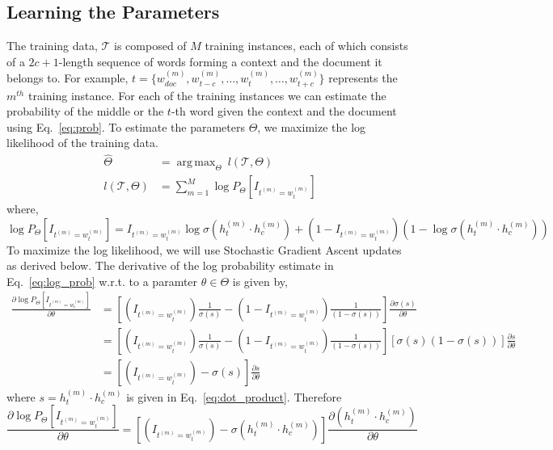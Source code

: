 \documentclass{article}
\DeclareMathOperator*{\argmax}{arg\,max}
\begin{document}
\subsection{Learning the Parameters}
The training data, $\mathcal{T}$ is composed of $M$ training instances, each of which consists of a $2c+1$-length sequence of words forming a context and the document it belongs to. For example, $t = \{w^{(m)}_{doc}, w^{(m)}_{t-c}, \ldots, w^{(m)}_{t}, \ldots, w^{(m)}_{t+c}\}$ represents the $m^{th}$ training instance. 
For each of the training instances we can estimate the probability of the middle or the $t$-th word given the context and the document using Eq.~\ref{eq:prob}. To estimate the parameters $\Theta$, we maximize the log likelihood of the training data. 
\begin{align}
\label{eq:arg_max}
\hat{\Theta} &=  \argmax_{\Theta}~l(\mathcal{T},\Theta)\\
\label{eq:logl}
l(\mathcal{T},\Theta)&= \sum_{m=1}^{M} \log P_{\Theta}\left[I_{t^{(m)}=w^{(m)}_{t}} \right]
\end{align}
where,
\begin{equation}
\label{eq:log_prob}
\log P_{\Theta}\left[I_{t^{(m)}=w^{(m)}_{t}} \right] = I_{t^{(m)}=w^{(m)}_{t}}\log \sigma(h^{(m)}_{t}\cdot h^{(m)}_{c}) + (1 - I_{t^{(m)}=w^{(m)}_{t}})(1 - \log \sigma(h^{(m)}_{t}\cdot h^{(m)}_{c}))
\end{equation}  
To maximize the log likelihood, we will use Stochastic Gradient Ascent updates as derived below.
The derivative of the log probability estimate in Eq.~\ref{eq:log_prob} w.r.t. to a paramter $\theta \in \Theta$ is given by, 
\begin{align}
\frac{\partial \log P_{\Theta}\left[I_{t^{(m)}=w^{(m)}_{t}} \right]}{\partial \theta} &= \left[ (I_{t^{(m)}=w^{(m)}_{t}})\frac{1}{ \sigma(s)} - (1 - I_{t^{(m)}=w^{(m)}_{t}})\frac{1}{(1 - \sigma(s))}\right] \frac{\partial \sigma(s)}{\partial \theta} \\
&= \left[ (I_{t^{(m)}=w^{(m)}_{t}})\frac{1}{ \sigma(s)} - (1 - I_{t^{(m)}=w^{(m)}_{t}})\frac{1}{(1 - \sigma(s))}\right] \left[\sigma(s)(1-\sigma(s))\right]\frac{\partial s}{\partial \theta} \\
&= \left[ (I_{t^{(m)}=w^{(m)}_{t}}) - \sigma(s)\right] \frac{\partial s}{\partial \theta}
\end{align}
where $s = h^{(m)}_{t}\cdot h^{(m)}_{c}$ is given in Eq.~\ref{eq:dot_product}. Therefore
\begin{equation}
\label{eq:derivative_general}
\frac{\partial \log P_{\Theta}\left[I_{t^{(m)}=w^{(m)}_{t}} \right]}{\partial \theta} = \left[ (I_{t^{(m)}=w^{(m)}_{t}}) - \sigma(h^{(m)}_{t}\cdot h^{(m)}_{c})\right] \frac{\partial (h^{(m)}_{t}\cdot h^{(m)}_{c})}{\partial \theta}
\end{equation}
\end{document}

